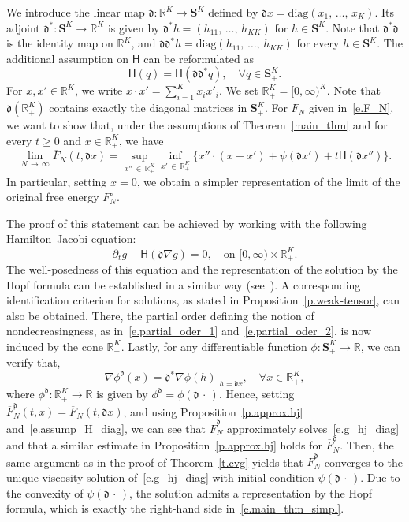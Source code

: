 \documentclass[AHL,Unicode,longabstracts,published]{cedram}
\newcommand{\R}{\mathbb{R}}
\renewcommand{\S}{\mathbf{S}}
\renewcommand{\H}{\mathsf{H}}
\newcommand{\diag}{\mathfrak{d}}
\newcommand{\diagl}{\mathrm{diag}}
\renewcommand{\ge}{\geqslant}
\renewcommand{\bar}{\overline}
\newcommand{\Ll}{\left}
\newcommand{\Rr}{\right}
\let\oldforall\forall
\renewcommand*{\forall}{\mathrel{\oldforall}}
\begin{document}
We introduce the linear map $\diag : \R^K\to \S^K$ defined by $\diag x = \diagl(x_1,\,\dots,\,x_K)$. Its adjoint $\diag^*:\S^K\to\R^K$ is given by $\diag^* h = (h_{11},\,\dots,\,h_{KK})$ for $h\in \S^K$. Note that $\diag^*\diag$ is the identity map on $\R^K$, and $\diag\diag^*h = \diagl(h_{11},\,\ldots,\,h_{KK})$ for every $h\in \S^K$. The additional assumption on $\H$ can be reformulated as
\begin{equation}\label{e.assump_H_diag}
\H(q) = \H\Ll(\diag\diag^*q\Rr),\quad\forall q\in \S^K_+.
\end{equation}
For $x,x'\in\R^K$, we write $x\cdot x' = \sum_{i=1}^Kx_ix'_i$. We set $\R_+^K= [0,\infty)^K$. Note that $\diag (\R^K_+)$ contains exactly the diagonal matrices in $\S^K_+$. For $F_N$ given in~\eqref{e.F_N}, we want to show that, under the assumptions of Theorem~\ref{main_thm} and for every $t \ge 0$ and $ x \in \R_+^K$, we have
\begin{equation}\label{e.main_thm_simpl}
\lim_{N\,\to\,\infty}\bar F_N(t,\diag x) = \sup_{x''\,\in\,\R^K_+}\inf_{x'\,\in\,\R^K_+}\big\{x''\cdot \left(x-x'\right)+\psi\left(\diag x'\right)+t\H\left(\diag x''\right)\big\}.
\end{equation}
In particular, setting $x=0$, we obtain a simpler representation of the limit of the original free energy $F^\circ_N$.

The proof of this statement can be achieved by working with the following Hamil\-ton--Jacobi equation:
\begin{equation}\label{e.g_hj_diag}
\partial_t g - \H(\diag \nabla g) =0,\quad \text{on }[0,\infty)\times\R^K_+.
\end{equation}
The well-posedness of this equation and the representation of the solution by the Hopf formula can be established in a similar way (see~\cite[Section~2]{chen2022hamilton}). A corresponding identification criterion for solutions, as stated in Proposition~\ref{p.weak-tensor}, can also be obtained. There, the partial order defining the notion of nondecreasingness, as in~\eqref{e.partial_oder_1} and~\eqref{e.partial_oder_2}, is now induced by the cone $\R^K_+$. Lastly, for any differentiable function $\phi:\S^K_+\to\R$, we can verify that,
\[
\nabla \phi^\diag(x) = \diag^* \nabla \phi(h)\big|_{h = \diag x},\quad\forall x \in \R^K_+,
\]
where $\phi^\diag:\R^K_+\to\R$ is given by $\phi^\diag = \phi(\diag\,\cdot\,)$. Hence, setting $\bar F^\diag_N(t,x) = \bar F_N(t,\diag x)$, and using Proposition~\ref{p.approx.hj} and~\eqref{e.assump_H_diag}, we can see that $\bar F^\diag_N$ approximately solves~\eqref{e.g_hj_diag} and that a similar estimate in Proposition~\ref{p.approx.hj} holds for $\bar F^\diag_N$. Then, the same argument as in the proof of Theorem~\ref{t.cvg} yields that $\bar F^\diag_N$ converges to the unique viscosity solution of~\eqref{e.g_hj_diag} with initial condition $\psi(\diag\,\cdot\,)$. Due to the convexity of $\psi(\diag\,\cdot\,)$, the solution admits a representation by the Hopf formula, which is exactly the right-hand side in~\eqref{e.main_thm_simpl}.
\end{document}
